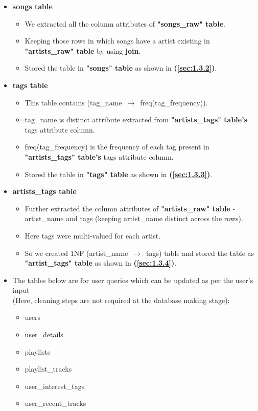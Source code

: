 \documentclass[10pt]{article}
\begin{document}
\begin{itemize}
\begin{itemize}
        \item \textbf{songs table}
        \begin{itemize}
            \item We extracted all the column attributes of \textbf{"songs\_raw" table}. 
            \item Keeping those rows in which songs have a artist existing in \textbf{"artists\_raw" table} by using \textbf{join}.
            \item Stored the table in \textbf{"songs" table} as shown in \textbf{(\autoref{sec:1.3.2})}.
        \end{itemize}
        
        \item \textbf{tags table}
        \begin{itemize}
            \item This table contains (tag\_name $\,\to\,$ freq(tag\_frequency)).
            \item tag\_name is distinct attribute extracted from \textbf{"artists\_tags" table's} tags attribute column. 
            \item freq(tag\_frequency) is the frequency of each tag present in \textbf{"artists\_tags" table's} tags attribute column. 
            \item Stored the table in \textbf{"tags" table} as shown in \textbf{(\autoref{sec:1.3.3})}.
        \end{itemize}
        
        \item \textbf{artists\_tags table}
        \begin{itemize}
            \item Further extracted the column attributes of \textbf{"artists\_raw" table} - artist\_name and tags (keeping artist\_name distinct across the rows). 
            \item Here tags were multi-valued for each artist. 
            \item So we created 1NF (artist\_name $\,\to\,$ tags) table and stored the table as \textbf{"artist\_tags" table} as shown in \textbf{(\autoref{sec:1.3.4})}.    
        \end{itemize}
        
        \item The tables below are for user queries which can be updated as per the user's input
        \\(Here, cleaning steps are not required at the database making stage):
        \begin{itemize}
            \item users
            \item user\_details
            \item playlists
            \item playlist\_tracks
            \item user\_interest\_tags
            \item user\_recent\_tracks
        \end{itemize}
        

\end{itemize}
\end{itemize}
\end{document}
